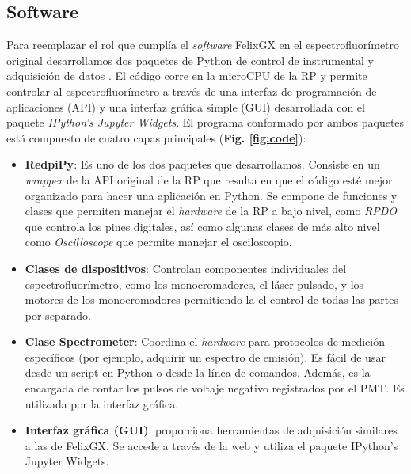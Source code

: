 \subsection{Software} \label{sec:software}

Para reemplazar el rol que cumplía el \textit{software} FelixGX en el espectrofluorímetro original desarrollamos dos paquetes de Python de control de instrumental y adquisición de datos \cite{napoli_tdinapoli_2024,grecco_hgrecco_2024}.
El código corre en la microCPU de la RP y permite controlar al espectrofluorímetro a través de una interfaz de programación de aplicaciones (API) y una interfaz gráfica simple (GUI) desarrollada con el paquete \textit{IPython's Jupyter Widgets}.
El programa conformado por ambos paquetes está compuesto de cuatro capas principales (\textbf{Fig. \ref{fig:code}}):

\begin{itemize}
     \item \textbf{RedpiPy}: Es uno de los dos paquetes que desarrollamos. Consiste en un \textit{wrapper} de la API original de la RP que resulta en que el código esté mejor organizado para hacer una aplicación en Python. Se compone de funciones y clases que permiten manejar el \textit{hardware} de la RP a bajo nivel, como \textit{RPDO} que controla los pines digitales, así como algunas clases de más alto nivel como \textit{Oscilloscope} que permite manejar el osciloscopio.
     \item \textbf{Clases de dispositivos}: Controlan componentes individuales del espectrofluorímetro, como los monocromadores, el láser pulsado, y los motores de los monocromadores permitiendo la el control de todas las partes por separado. 
     \item \textbf{Clase Spectrometer}: Coordina el \textit{hardware} para protocolos de medición específicos (por ejemplo, adquirir un espectro de emisión). Es fácil de usar desde un script en Python o desde la línea de comandos. Además, es la encargada de contar los pulsos de voltaje negativo registrados por el PMT. Es utilizada por la interfaz gráfica.
     \item \textbf{Interfaz gráfica (GUI)}: proporciona herramientas de adquisición similares a las de FelixGX. Se accede a través de la web y utiliza el paquete IPython's Jupyter Widgets.
\end{itemize}

